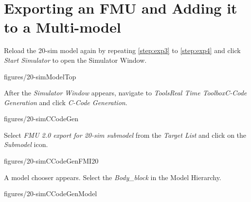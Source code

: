 \documentclass[11pt,a4paper]{../tutorial}
\begin{document}
\newpage

\section{Exporting an FMU and Adding it to a Multi-model}

\begin{instructions}

\item \label{step:exp1} Reload the 20-sim model again by repeating \ref{step:exp3} to \ref{step:exp4} and click \emph{Start Simulator} to open the Simulator Window.

    \begin{annotation}[width=0.8\linewidth]{figures/20-simModelTop}
    \end{annotation}

\newpage

\item After the \emph{Simulator Window} appears, navigate to \emph{Tools\menusep Real Time Toolbox\menusep C-Code Generation} and click \emph{C-Code Generation}.

   \begin{annotation}[width=0.8\linewidth]{figures/20-simCCodeGen}
    \end{annotation}

\item Select \emph{FMU 2.0 export for 20-sim submodel} from the \emph{Target List} and click on the \emph{Submodel} icon.

   \begin{annotation}[width=0.5\linewidth]{figures/20-simCCodeGenFMI20}
	   
   \end{annotation}

\newpage

\item A model chooser appears. Select the \emph{Body\_block} in the Model Hierarchy. 

   \begin{annotation}[width=0.5\linewidth]{figures/20-simCCodeGenModel}
   \end{annotation}


\end{instructions}
\end{document}
